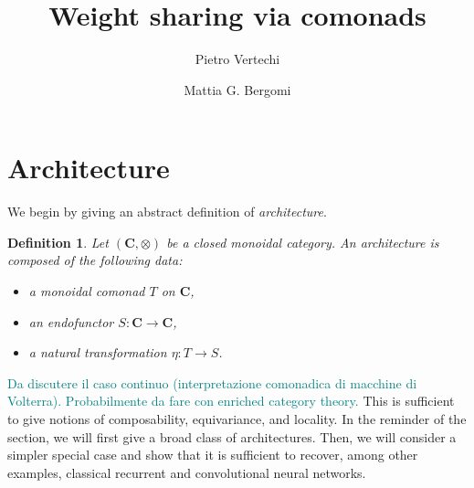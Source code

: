 \documentclass[12pt]{article}
\title{Weight sharing via comonads}
\author{
    Pietro Vertechi \and Mattia G. Bergomi
}
\date{}
\newtheorem{definition}{Definition}
\newcommand{\pietro}[1]{\textcolor{teal}{#1}}
\newcommand{\Obj}{{\textnormal{Obj}}}
\newcommand{\Cat}{{\mathbf{C}}}
\newcommand{\LCat}{{\mathbf{L}}}
\begin{document}
\maketitle
\begin{abstract}
\end{abstract}

\section{Architecture}

We begin by giving an abstract definition of {\em architecture}.


\begin{definition}\label{def:architecture}
    Let $(\Cat, \otimes)$ be a closed monoidal category.
    An {\em architecture} is composed of the following data:
    \begin{itemize}
        \item a monoidal comonad $T$ on $\Cat$,
        \item an endofunctor $S \colon \Cat \rightarrow \Cat$,
        \item a natural transformation $\eta \colon T \rightarrow S$.
    \end{itemize}
\end{definition}


\pietro{Da discutere il caso continuo (interpretazione comonadica di macchine di Volterra). Probabilmente da fare con enriched category theory.}
This is sufficient to give notions of composability, equivariance, and locality. In the reminder of the section, we will first give a broad class of architectures. Then, we will consider a simpler special case and show that it is sufficient to recover, among other examples, classical recurrent and convolutional neural networks.
\end{document}
